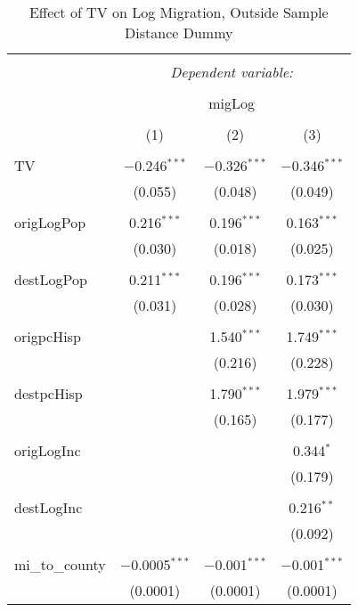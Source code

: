 
\begin{table}[!htbp] \centering 
  \caption{Effect of TV on Log Migration, Outside Sample Distance Dummy} 
  \label{} 
\begin{tabular}{@{\extracolsep{5pt}}lccc} 
\\[-1.8ex]\hline 
\hline \\[-1.8ex] 
 & \multicolumn{3}{c}{\textit{Dependent variable:}} \\ 
\cline{2-4} 
\\[-1.8ex] & \multicolumn{3}{c}{migLog} \\ 
\\[-1.8ex] & (1) & (2) & (3)\\ 
\hline \\[-1.8ex] 
 TV & $-$0.246$^{***}$ & $-$0.326$^{***}$ & $-$0.346$^{***}$ \\ 
  & (0.055) & (0.048) & (0.049) \\ 
  & & & \\ 
 origLogPop & 0.216$^{***}$ & 0.196$^{***}$ & 0.163$^{***}$ \\ 
  & (0.030) & (0.018) & (0.025) \\ 
  & & & \\ 
 destLogPop & 0.211$^{***}$ & 0.196$^{***}$ & 0.173$^{***}$ \\ 
  & (0.031) & (0.028) & (0.030) \\ 
  & & & \\ 
 origpcHisp &  & 1.540$^{***}$ & 1.749$^{***}$ \\ 
  &  & (0.216) & (0.228) \\ 
  & & & \\ 
 destpcHisp &  & 1.790$^{***}$ & 1.979$^{***}$ \\ 
  &  & (0.165) & (0.177) \\ 
  & & & \\ 
 origLogInc &  &  & 0.344$^{*}$ \\ 
  &  &  & (0.179) \\ 
  & & & \\ 
 destLogInc &  &  & 0.216$^{**}$ \\ 
  &  &  & (0.092) \\ 
  & & & \\ 
 mi\_to\_county & $-$0.0005$^{***}$ & $-$0.001$^{***}$ & $-$0.001$^{***}$ \\ 
  & (0.0001) & (0.0001) & (0.0001) \\ 

\end{tabular}
\end{table}
